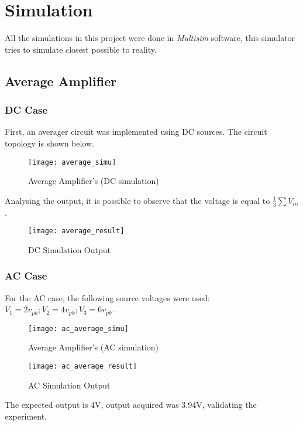 \documentclass[journal]{IEEEtran}
\begin{document}
\section{Simulation}  
    All the simulations in this project were done in \textit{Multisim} software, this simulator tries to simulate closest possible to reality.
    \subsection{Average Amplifier}
        \subsubsection{DC Case}
            First, an averager circuit was implemented using DC sources. The circuit topology is shown below.
            \begin{figure}[ht]
                \centering
                \texttt{[image: average\_simu]}
                \caption{Average Amplifier's (DC simulation)}
                \label{fig:average_simu}
            \end{figure}
            \par Analysing the output, it is possible to observe that the voltage is equal to $\frac{1}{3}\sum V_{in}$.
            \begin{figure}[ht]
                \centering
                \texttt{[image: average\_result]}
                \caption{DC Simulation Output }
                \label{fig:average_result}
            \end{figure}
        
        \subsubsection{AC Case} 
            For the AC case, the following source voltages were used: $V_1 = 2v_{pk}; V_2 = 4v_{pk}; V_3 = 6v_{pk}$.
            \begin{figure}[H]
                \centering
                \texttt{[image: ac\_average\_simu]}
                \caption{Average Amplifier's (AC simulation)}
                \label{fig:my_label}
            \end{figure}
            \begin{figure}[H]
                \centering
                \texttt{[image: ac\_average\_result]}
                \caption{AC Simulation Output }
                \label{fig:ac_average_result}
            \end{figure}
            \par The expected output is 4V, output acquired was 3.94V, validating the experiment.
\end{document}
